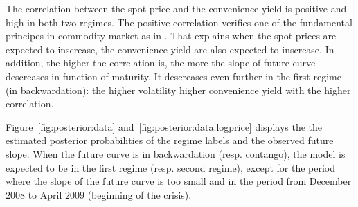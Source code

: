 

The correlation between the spot price and the convenience yield is positive and high in both two regimes. The positive correlation verifies one of the fundamental principes in commodity market as in \cite{gibson:schwartz:1990}. That explains when the spot prices are expected to inscrease, the convenience yield are also expected to inscrease. In addition, the higher the correlation is, the more the slope of future curve descreases in function of maturity. It descreases even further in the first regime (in backwardation): the higher volatility higher convenience yield with the higher correlation.


Figure~\ref{fig:posterior:data} and~\ref{fig:posterior:data:logprice} displays the the estimated posterior probabilities of the regime labels and the observed future slope. When the future curve is in backwardation (resp. contango), the model is expected to be in the first regime (resp. second regime), except for the period where the slope of the future curve is too small and in the period from December $2008$ to April $2009$ (beginning of the crisis). 






